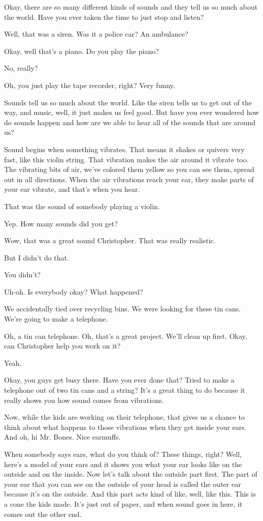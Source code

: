 Okay, there are so many different kinds of sounds and they tell us so much about the world. Have you ever taken the time to just stop and listen?

Well, that was a siren. Was it a police car? An ambulance?

Okay, well that's a piano. Do you play the piano?

No, really?

Oh, you just play the tape recorder, right? Very funny.

Sounds tell us so much about the world. Like the siren tells us to get out of the way, and music, well, it just makes us feel good. But have you ever wondered how do sounds happen and how are we able to hear all of the sounds that are around us?

Sound begins when something vibrates. That means it shakes or quivers very fast, like this violin string. That vibration makes the air around it vibrate too. The vibrating bits of air, we've colored them yellow so you can see them, spread out in all directions. When the air vibrations reach your ear, they make parts of your ear vibrate, and that's when you hear.

That was the sound of somebody playing a violin.

Yep. How many sounds did you get?

Wow, that was a great sound Christopher. That was really realistic.

But I didn't do that.

You didn't?

Uh-oh. Is everybody okay? What happened?

We accidentally tied over recycling bins. We were looking for these tin cans. We're going to make a telephone.

Oh, a tin can telephone. Oh, that's a great project. We'll clean up first. Okay, can Christopher help you work on it?

Yeah.

Okay, you guys get busy there. Have you ever done that? Tried to make a telephone out of two tin cans and a string? It's a great thing to do because it really shows you how sound comes from vibrations.

Now, while the kids are working on their telephone, that gives us a chance to think about what happens to those vibrations when they get inside your ears. And oh, hi Mr. Bones. Nice earmuffs.

When somebody says ears, what do you think of? These things, right? Well, here's a model of your ears and it shows you what your ear looks like on the outside and on the inside. Now let's talk about the outside part first. The part of your ear that you can see on the outside of your head is called the outer ear because it's on the outside. And this part acts kind of like, well, like this. This is a cone the kids made. It's just out of paper, and when sound goes in here, it comes out the other end.

